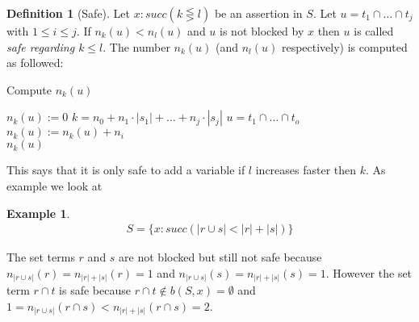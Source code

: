 \documentclass[a4paper,11pt]{scrartcl}
\theoremstyle{break}
\theoremstyle{definition}
\newtheorem{mydef}{Definition}
\newtheorem{ex}{Example}
\begin{document}
\begin{mydef}[Safe]
Let $x:succ(k\lesseqgtr l)$ be an assertion in $S$. Let $u=t_1\cap\dots \cap t_j$ with $1\leq i\leq j$. If $n_k(u)<n_l(u)$ and $u$ is not blocked by $x$ then $u$ is called \textit{safe regarding $k\leq l$}. The number $n_k(u)$ (and $n_l(u)$ respectively) is computed as followed:
\begin{algorithm}[H] \caption{Compute $n_k(u)$}
\begin{algorithmic}[l]
\State $n_k(u):=0$
\State $k=n_0+n_1\cdot|s_1|+\dots+n_j\cdot|s_j|$
\State $u=t_1\cap \dots \cap t_o$
\State $n_k(u):=n_k(u)+n_i$
\EndIf
\EndFor\\
\Return $n_k(u)$
\end{algorithmic}
\end{algorithm}
\end{mydef}
This says that it is only safe to add a variable if $l$ increases faster then $k$.
As example we look at 
\begin{ex}
\begin{align*}
S=\{x:succ(|r\cup s|<|r|+|s|)\}
\end{align*}
\end{ex}
The set terms $r$ and $s$ are not blocked but still not safe because $n_{|r\cup s|}(r)=n_{|r|+|s|}(r)=1$ and $n_{|r\cup s|}(s)=n_{|r|+|s|}(s)=1$. However the set term $r\cap t$ is safe because $r\cap t\notin b(S,x)=\emptyset$ and $1=n_{|r\cup s|}(r\cap s)<n_{|r|+|s|}(r\cap s)=2$. 
\end{document}

